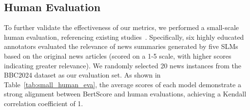 



\subsection{Human Evaluation}


To further validate the effectiveness of our metrics, we performed a small-scale human evaluation, referencing existing studies~\cite{fabbri2021summeval}. Specifically, six highly educated annotators evaluated the relevance of news summaries generated by five SLMs based on the original news articles (scored on a 1-5 scale, with higher scores indicating greater relevance). We randomly selected 20 news instances from the BBC2024 dataset as our evaluation set. As shown in Table~\ref{tab:small_human_eva}, the average scores of each model demonstrate a strong alignment between BertScore and human evaluations, achieving a Kendall correlation coefficient of 1.

